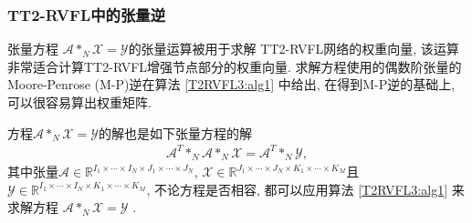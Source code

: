 \subsubsection{TT2-RVFL中的张量逆} \label{Trapezoidsection5-1}
张量方程 $\mathcal A *_N \mathcal X = \mathcal Y$的张量运算被用于求解 TT2-RVFL网络的权重向量,  该运算非常适合计算TT2-RVFL增强节点部分的权重向量.
求解方程使用的偶数阶张量的 Moore-Penrose (M-P)逆在算法 \ref{T2RVFL3:alg1} 中给出,  在得到M-P逆的基础上, 可以很容易算出权重矩阵.
\begin{remark}
方程$\mathcal A *_N \mathcal X = \mathcal Y$的解也是如下张量方程的解
\begin{align}
  \mathcal A^T *_N\mathcal  A *_N \mathcal X = \mathcal A^T *_N \mathcal Y,
\end{align}
其中张量$\mathcal A \in \mathbb R^{I_1\times \cdots\times I_N\times J_1\times \cdots\times J_N} $, $\mathcal X \in \mathbb R^{J_1\times \cdots\times J_N\times K_1\times \cdots\times K_M} $且 $\mathcal Y \in \mathbb R^{I_1\times \cdots\times I_N\times K_1\times \cdots\times K_M} $, 不论方程是否相容, 都可以应用算法 \ref{T2RVFL3:alg1} 来求解方程 $\mathcal  A *_N \mathcal X = \mathcal Y$ \cite{HuangZhao2018NCAA-5838}.
\end{remark}
